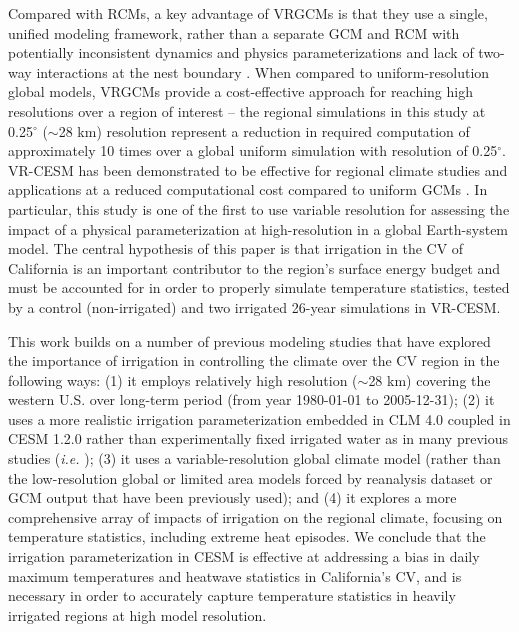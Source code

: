 \documentclass[draft,ms]{agutex}   %
\begin{document}
\begin{article}
Compared with RCMs, a key advantage of VRGCMs is that they use a single, unified modeling framework, rather than a separate GCM and RCM with potentially inconsistent dynamics and physics parameterizations and lack of two-way interactions at the nest boundary \citep{laprise2008challenging}. When compared to uniform-resolution global models, VRGCMs provide a cost-effective approach for reaching high resolutions over a region of interest -- the regional simulations in this study at 0.25$^\circ$ ($\sim$28 km) resolution represent a reduction in required computation of approximately 10 times over a global uniform simulation with resolution of 0.25$^\circ$. VR-CESM has been demonstrated to be effective for regional climate studies and applications at a reduced computational cost compared to uniform GCMs \citep{zarzycki2015effects, rhoades2015characterizing, huang2016evaluation}. In particular, this study is one of the first to use variable resolution for assessing the impact of a physical parameterization at high-resolution in a global Earth-system model. The central hypothesis of this paper is that irrigation in the CV of California is an important contributor to the region's surface energy budget and must be accounted for in order to properly simulate temperature statistics, tested by a control (non-irrigated) and two irrigated 26-year simulations in VR-CESM.

This work builds on a number of previous modeling studies that have explored the importance of irrigation in controlling the climate over the CV region in the following ways: (1) it employs relatively high resolution ($\sim$28 km) covering the western U.S. over long-term period  (from year 1980-01-01 to 2005-12-31); (2) it uses a more realistic irrigation parameterization embedded in CLM 4.0 coupled in CESM 1.2.0 rather than experimentally fixed irrigated water as in many previous studies (\textit{i.e.} \cite{lobell2006biogeophysical, lo2013irrigation}); (3) it uses a variable-resolution global climate model (rather than the low-resolution global or limited area models forced by reanalysis dataset or GCM output that have been previously used); and (4) it explores a more comprehensive array of impacts of irrigation on the regional climate, focusing on temperature statistics, including extreme heat episodes.  We conclude that the irrigation parameterization in CESM is effective at addressing a bias in daily maximum temperatures and heatwave statistics in California's CV, and is necessary in order to accurately capture temperature statistics in heavily irrigated regions at high model resolution.


\end{article}
\end{document}
